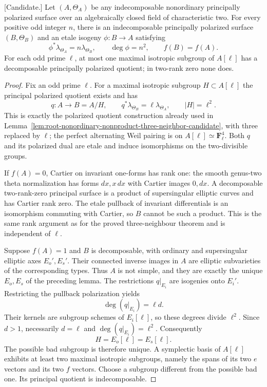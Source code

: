 \begin{theorem}
\label{thm:nonordinary-arbitrary-odd-neighbor-candidate}
\textup{[Candidate.]}
Let $(A,\Theta_A)$ be any indecomposable nonordinary principally
polarized surface over an algebraically closed field of
characteristic two. For every positive odd integer $n$, there is an
indecomposable principally polarized surface $(B,\Theta_B)$ and an
etale isogeny $\phi:B\to A$ satisfying
\[
 \phi^*\lambda_{\Theta_A}=n\lambda_{\Theta_B},
 \qquad \deg\phi=n^2,\qquad f(B)=f(A).
\]
For each odd prime $\ell$, at most one maximal isotropic subgroup
of $A[\ell]$ has a decomposable principally polarized quotient;
in two-rank zero none does.
\end{theorem}

\begin{proof}
Fix an odd prime $\ell$. For a maximal isotropic subgroup
$H\subset A[\ell]$ the principal polarized quotient exists and has
\[
 q:A\longrightarrow B=A/H,\qquad
 q^*\lambda_{\Theta_B}=\ell\lambda_{\Theta_A},\qquad
 |H|=\ell^2.
\]
This is exactly the polarized quotient construction already used
in Lemma~\ref{lem:root-nonordinary-nonproduct-three-neighbor-candidate},
with three replaced by $\ell$; the perfect alternating Weil pairing
is on $A[\ell]\simeq\mathbf F_\ell^4$. Both $q$ and its polarized
dual are etale and induce isomorphisms on the two-divisible groups.

If $f(A)=0$, Cartier on invariant one-forms has rank one: the
smooth genus-two theta normalization has forms $dx,x\,dx$ with
Cartier images $0,dx$. A decomposable two-rank-zero principal
surface is a product of supersingular elliptic curves and has
Cartier rank zero. The etale pullback of invariant differentials
is an isomorphism commuting with Cartier, so $B$ cannot be such
a product. This is the same rank argument as for the proved
three-neighbour theorem and is independent of $\ell$.

Suppose $f(A)=1$ and $B$ is decomposable, with ordinary and
supersingular elliptic axes $E_o',E_s'$. Their connected inverse
images in $A$ are elliptic subvarieties of the corresponding types.
Thus $A$ is not simple, and they are exactly the unique $E_o,E_s$
of the preceding lemma. The restrictions $q|_{E_i}$ are isogenies
onto $E_i'$. Restricting the pullback polarization yields
\[
                    \deg(q|_{E_i})=\ell d.
\]
Their kernels are subgroup schemes of $E_i[\ell]$, so these degrees
divide $\ell^2$. Since $d>1$, necessarily $d=\ell$ and
$\deg(q|_{E_i})=\ell^2$. Consequently
\[
                         H=E_o[\ell]=E_s[\ell].
\]
The possible bad subgroup is therefore unique. A symplectic basis
of $A[\ell]$ exhibits at least two maximal isotropic subgroups,
namely the spans of its two $e$ vectors and its two $f$ vectors.
Choose a subgroup different from the possible bad one. Its
principal quotient is indecomposable.


\end{proof}
